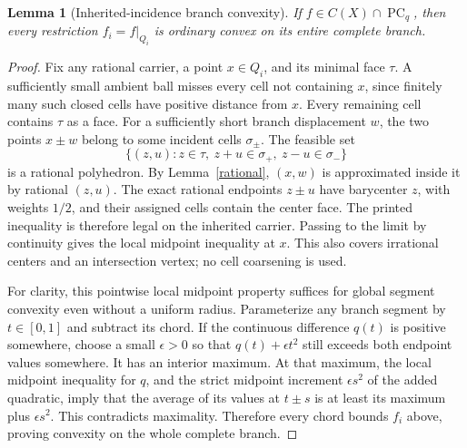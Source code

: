 \documentclass[11pt]{article}
\newtheorem{lemma}[theorem]{Lemma}
\newcommand{\PC}{\operatorname{PC}_{q}}
\begin{document}
\begin{lemma}[Inherited-incidence branch convexity]\label{branchconvex}
If $f\in C(X)\cap\PC$, then every restriction $f_i=f|_{Q_i}$ is ordinary convex on its entire complete branch.
\end{lemma}
\begin{proof}
Fix any rational carrier, a point $x\in Q_i$, and its minimal face $\tau$. A sufficiently small ambient ball misses every cell not containing $x$, since finitely many such closed cells have positive distance from $x$. Every remaining cell contains $\tau$ as a face. For a sufficiently short branch displacement $w$, the two points $x\pm w$ belong to some incident cells $\sigma_\pm$. The feasible set
\[
 \{(z,u):z\in\tau,\ z+u\in\sigma_+,\ z-u\in\sigma_-\}
\]
is a rational polyhedron. By Lemma~\ref{rational}, $(x,w)$ is approximated inside it by rational $(z,u)$. The exact rational endpoints $z\pm u$ have barycenter $z$, with weights $1/2$, and their assigned cells contain the center face. The printed inequality is therefore legal on the inherited carrier. Passing to the limit by continuity gives the local midpoint inequality at $x$. This also covers irrational centers and an intersection vertex; no cell coarsening is used.

For clarity, this pointwise local midpoint property suffices for global segment convexity even without a uniform radius. Parameterize any branch segment by $t\in[0,1]$ and subtract its chord. If the continuous difference $q(t)$ is positive somewhere, choose a small $\epsilon>0$ so that $q(t)+\epsilon t^2$ still exceeds both endpoint values somewhere. It has an interior maximum. At that maximum, the local midpoint inequality for $q$, and the strict midpoint increment $\epsilon s^2$ of the added quadratic, imply that the average of its values at $t\pm s$ is at least its maximum plus $\epsilon s^2$. This contradicts maximality. Therefore every chord bounds $f_i$ above, proving convexity on the whole complete branch.
\end{proof}
\end{document}
